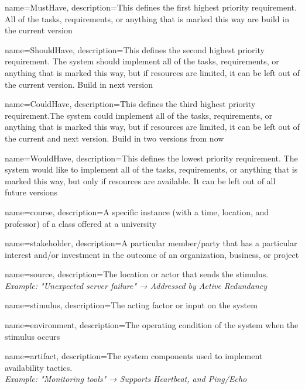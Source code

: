 \label{Chapter::Glossary}
{	name={MustHave},
	description={This defines the first highest priority requirement.
	All of the tasks, requirements, or anything that is marked this way are
	build in the current version}
}

{	name={ShouldHave},
	description={This defines the second highest priority requirement. The system should implement 
	all of the tasks, requirements, or anything that is marked this way, but if 
	resources are limited, it can be left out of the current version.
	Build in next version}
}

{	name={CouldHave},
	description={This defines the third highest priority requirement.The system could implement 
	all of the tasks, requirements, or anything that is marked this way, but if 
	resources are limited, it can be left out of the current and next version.
	Build in two versions from now}
}

{	name={WouldHave},
	description={This defines the lowest priority requirement.  The system would like to implement 
all of the tasks, requirements, or anything that is marked this way, but only
if resources are available. It can be left out of all future versions}
}

{	name={course},
	description={A specific instance (with a time, location, and professor) of a class offered at a university}
}

{   name={stakeholder},
        description={A particular member/party that has a particular interest and/or investment in the outcome of an organization, business, or project}
}

{	name={source},
	description={The location or actor that sends the stimulus. \\ \textit{Example: "Unexpected server failure" → Addressed by Active Redundancy}}
}

{	name={stimulus},
	description={The acting factor or input on the system}
}

{	name={environment},
	description={The operating condition of the system when the stimulus occurs}
}

{	name={artifact},
	description={The system components used to implement availability tactics. \\ \textit{Example: "Monitoring tools" → Supports Heartbeat, and Ping/Echo}}
}

